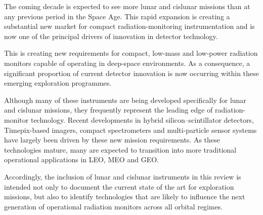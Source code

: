 
The coming decade is expected to see more lunar and cislunar missions than at any previous period in the Space Age. This rapid expansion is creating a substantial new market for compact radiation-monitoring instrumentation and is now one of the principal drivers of innovation in detector technology. \cite{NASA_LunarStrategy,CSIS_Cislunar2024}


This is creating new requirements for compact, low-mass and low-power radiation monitors capable of operating in deep-space environments. As a consequence, a significant proportion of current detector innovation is now occurring within these emerging exploration programmes.

Although many of these instruments are being developed specifically for lunar and cislunar missions, they frequently represent the leading edge of radiation-monitor technology. Recent developments in hybrid silicon--scintillator detectors, Timepix-based imagers, compact spectrometers and multi-particle sensor systems have largely been driven by these new mission requirements. As these technologies mature, many are expected to transition into more traditional operational applications in LEO, MEO and GEO.

Accordingly, the inclusion of lunar and cislunar instruments in this review is intended not only to document the current state of the art for exploration missions, but also to identify technologies that are likely to influence the next generation of operational radiation monitors across all orbital regimes.
